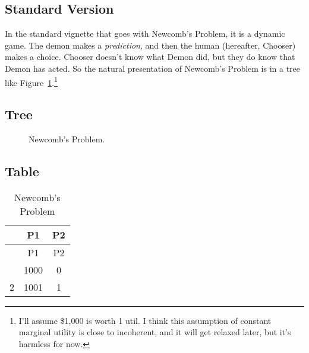 \documentclass[
  10pt,
  letterpaper,
  DIV=11,
  numbers=noendperiod,
  twoside]{scrartcl}
\begin{document}
\subsection{Standard Version}\label{standard-version}

In the standard vignette that goes with Newcomb's Problem, it is a
dynamic game. The demon makes a \emph{prediction}, and then the human
(hereafter, Chooser) makes a choice. Chooser doesn't know what Demon
did, but they do know that Demon has acted. So the natural presentation
of Newcomb's Problem is in a tree like
Figure~\ref{fig-standard-newcomb}.\footnote{I'll assume \$1,000 is worth
  1 util. I think this assumption of constant marginal utility is close
  to incoherent, and it will get relaxed later, but it's harmless for
  now.}

\subsection{Tree}

\begin{figure}


\caption{\label{fig-standard-newcomb}Newcomb's Problem.}

\end{figure}%

\subsection{Table}

\begin{longtable}[]{@{}ccc@{}}
\caption{Newcomb's Problem}\label{tbl-standard-newcomb}\tabularnewline
\toprule\noalign{}
& P1 & P2 \\
\midrule\noalign{}
\endfirsthead
\toprule\noalign{}
& P1 & P2 \\
\midrule\noalign{}
\endhead
\bottomrule\noalign{}
\endlastfoot
1 & 1000 & 0 \\
2 & 1001 & 1 \\
\end{longtable}
\end{document}
